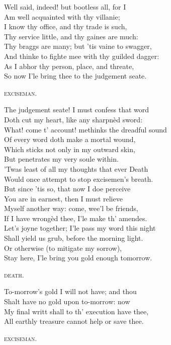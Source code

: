 \begin{dcverse}
Well said, indeed! but bootless all, for I\\
Am well acquainted with thy villanie;\\
I know thy office, and thy trade is such,\\
Thy service little, and thy gaines are much:\\
Thy braggs are many; but ’tis vaine to swagger,\\
And thinke to fighte mee with thy guilded dagger:\\
As I abhor thy person, place, and threate,\\
So now I’le bring thee to the judgement seate.

\columnbreak
\vin\vin\vin\vin \textsc{exciseman}.

The judgement seate! I must confess that word\\
Doth cut my heart, like any sharpnèd sword:\\
What! come t’ account! methinks the dreadful sound\\
Of every word doth make a mortal wound,\\
Which sticks not only in my outward skin,\\
But penetrates my very soule within.\\
’Twas least of all my thoughts that ever Death\\
Would once attempt to stop excisemen’s breath.\\
But since ’tis so, that now I doe perceive\\
You are in earnest, then I must relieve\\
Myself another way: come, wee’l be friends,\\
If I have wrongèd thee, I’le make th’ amendes.\\
Let’s joyne together; I’le pass my word this night\\
Shall yield us grub, before the morning light.\\
Or otherwise (to mitigate my sorrow),\\
Stay here, I’le bring you gold enough tomorrow.

\vin\vin\vin\vin \textsc{death}.

To-morrow’s gold I will not have; and thou\\
Shalt have no gold upon to-morrow: now\\
My final writt shall to th’ execution have thee,\\
All earthly treasure cannot help or save thee.

\vin\vin\vin\vin \textsc{exciseman}.


\end{dcverse}
